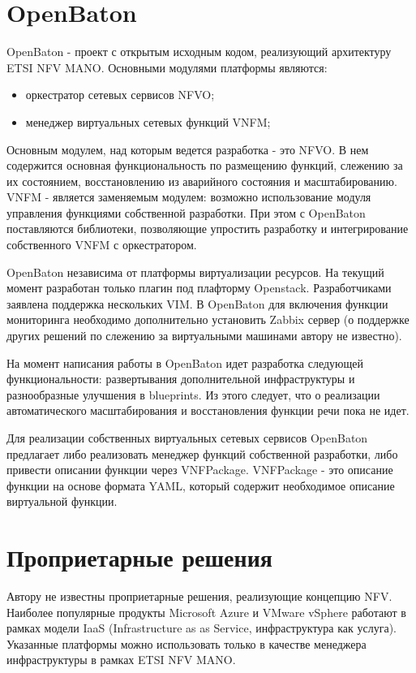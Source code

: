 \documentclass[oneside,final,14pt,a4paper]{extreport}
\begin{document}
\section{OpenBaton}
OpenBaton - проект с открытым исходным кодом, реализующий архитектуру ETSI NFV MANO. Основными модулями платформы являются:
\begin{itemize}
	\item оркестратор сетевых сервисов NFVO;
	\item менеджер виртуальных сетевых функций VNFM;
\end{itemize}

Основным модулем, над которым ведется разработка - это NFVO. В нем содержится основная функциональность по размещению функций, слежению за их состоянием, восстановлению из аварийного состояния и масштабированию. VNFM - является заменяемым модулем: возможно использование модуля управления функциями собственной разработки. При этом с OpenBaton поставляются библиотеки, позволяющие упростить разработку и интегрирование собственного VNFM с оркестратором.

OpenBaton независима от платформы виртуализации ресурсов. На текущий момент разработан только плагин под плафторму Openstack. Разработчиками заявлена поддержка нескольких VIM. В OpenBaton для включения функции мониторинга необходимо дополнительно установить Zabbix сервер (о поддержке других решений по слежению за виртуальными машинами автору не известно).

На момент написания работы в OpenBaton идет разработка следующей функциональности: развертывания дополнительной инфраструктуры и разнообразные улучшения в blueprints. Из этого следует, что о реализации автоматического масштабирования и восстановления функции речи пока не идет.

Для реализации собственных виртуальных сетевых сервисов OpenBaton предлагает либо реализовать менеджер функций собственной разработки, либо привести описании функции через VNFPackage. VNFPackage - это описание функции на основе формата YAML, который содержит необходимое описание виртуальной функции.\cite{bib:openbaton-official}


\section{Проприетарные решения}
Автору не известны проприетарные решения, реализующие концепцию NFV. Наиболее популярные продукты Microsoft Azure и VMware vSphere работают в рамках модели IaaS (Infrastructure as as Service, инфраструктура как услуга). Указанные платформы можно использовать только в качестве менеджера инфраструктуры в рамках ETSI NFV MANO.
\end{document}
